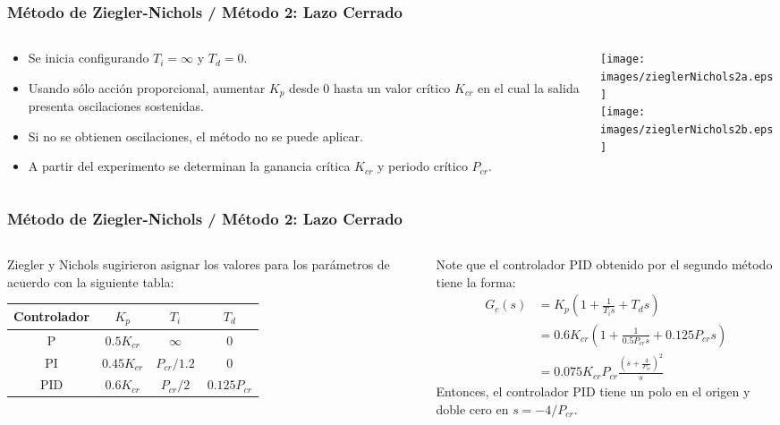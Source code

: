 \documentclass[aspectratio=169]{beamer}
\theoremstyle{definition}
\theoremstyle{plain}
\theoremstyle{remark}
\begin{document}
\begin{frame}[<+->]\frametitle{Método de Ziegler-Nichols / Método 2: Lazo Cerrado}
\begin{columns}
\begin{column}{0.5\textwidth}
	\begin{itemize}
		\item Se inicia configurando $T_i = \infty$ y $T_d = 0$.
		\item Usando sólo acción proporcional, aumentar $K_p$ desde 0 hasta un valor crítico $K_{cr}$ en el cual la salida presenta oscilaciones sostenidas.
		\item Si no se obtienen oscilaciones, el método no se puede aplicar.
		\item A partir del experimento se determinan la ganancia crítica $K_{cr}$ y periodo crítico $P_{cr}$.
	\end{itemize}	
\end{column}	
\begin{column}{0.5\textwidth}
	\texttt{[image: images/zieglerNichols2a.eps]}\\
	\vspace*{5mm}
	\texttt{[image: images/zieglerNichols2b.eps]}
\end{column}	
\end{columns}
\end{frame}
\small
\begin{frame}[<+->]\frametitle{Método de Ziegler-Nichols / Método 2: Lazo Cerrado}
\begin{columns}
\begin{column}{0.5\textwidth}
	Ziegler y Nichols sugirieron asignar los valores para los parámetros de acuerdo con la siguiente tabla:
	\footnotesize
	\begin{table}
	\begin{tabular}{c|c|c|c}
		Controlador & $K_p$ & $T_i$ & $T_d$\\
		\hline
		P   & $0.5  K_{cr}$ & $\infty$ & 0\\
		PI  & $0.45 K_{cr}$ & $P_{cr}/1.2$ & 0\\
		PID & $0.6  K_{cr}$ & $P_{cr}/2$ & $0.125P_{cr}$
	\end{tabular}
	\end{table}
\end{column}	
\begin{column}{0.5\textwidth}
\small
Note que el controlador PID obtenido por el segundo método tiene la forma:
\begin{align*}
	G_c(s) &= K_p\left( 1 + \frac{1}{T_i s} + T_d s \right)\\
	&= 0.6 K_{cr} \left( 1 + \frac{1}{0.5 P_{cr}s} + 0.125 P_{cr}s \right)\\
	&= 0.075K_{cr}P_{cr} \frac{\left( s + \frac{4}{P_{cr}} \right)^2}{s}
\end{align*}
Entonces, el controlador PID tiene un polo en el origen y doble cero en $s = -4/P_{cr}$.
\end{column}	
\end{columns}
\end{frame}
\end{document}
